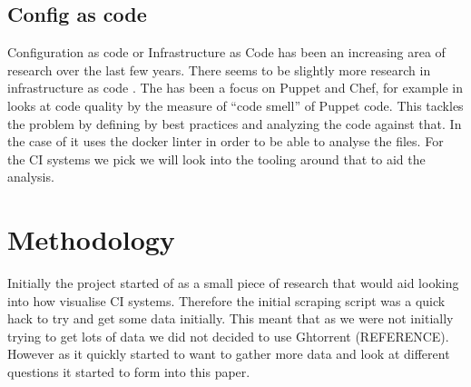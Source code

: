\documentclass[twoside,12pt,titlepage,a4paper]{article}
\begin{document}
\vspace*{-0.05in}
\subsection{Config as code}
\vspace*{-0.05in}

Configuration as code or Infrastructure as Code has been an increasing area of research over the last few years. There seems to be slightly more research in infrastructure as code \citet{Rahman2019}. The has been a focus on Puppet and Chef, for example in \citet{Sharma2016} looks at code quality by the measure of \enquote{code smell} of Puppet code. This tackles the problem by defining by best practices and analyzing the code against that. In the case of \citet{Cito2017} it uses the docker linter in order to be able to analyse the files. 
For the CI systems we pick we will look into the tooling around that to aid the analysis.


\section{Methodology}
\label{methodology}

Initially the project started of as a small piece of research that would aid looking into how visualise CI systems. Therefore the initial scraping script was a quick hack to try and get some data initially. This meant that as we were not initially trying to get lots of data we did not decided to use Ghtorrent (REFERENCE). However as it quickly started to want to gather more data and look at different questions it started to form into this paper. 
\end{document}
